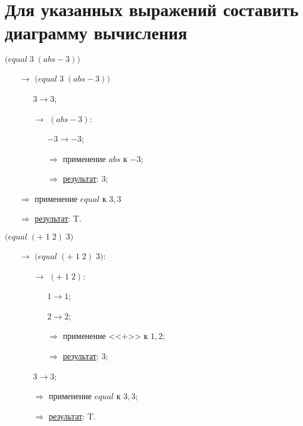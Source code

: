 
\section{Для указанных выражений составить диаграмму вычисления}

\vfill
\problem $\bigl(equal\; 3\; (abs -\!3)\bigr)$

\begin{itemize}
	\item[$\longrightarrow$]$\bigl(equal\; 3\; (abs -\!3)\bigr)$
	\begin{itemize}
		\item[\textbullet] $3 \to 3$;
		\item[$\longrightarrow$] $(abs -\!3)$:
		\begin{itemize}
			\item[\textbullet] $-3 \to -3$;
			\item[$\Longrightarrow$] применение $abs$ к $-3$;
			\item[$\Longrightarrow$] \underline{результат}: $3$;
		\end{itemize}
	\end{itemize}
	\item[$\Longrightarrow$] применение $equal$ к $3, 3$
	\item[$\Longrightarrow$] \underline{результат}: T.
\end{itemize}
\vfill


\problem $\bigl(equal\; (+\; 1\; 2)\; 3\bigr)$

\begin{itemize}
	\item[$\longrightarrow$] $\bigl(equal\; (+\; 1\; 2)\; 3\bigr)$:
	\begin{itemize}
		\item[$\longrightarrow$] $(+\; 1\; 2)$:
		\begin{itemize}
			\item[\textbullet] $1 \to 1$;
			\item[\textbullet] $2 \to 2$;
			\item[$\Longrightarrow$] применение <<$+$>> к $1, 2$;
			\item[$\Longrightarrow$] \underline{результат}: $3$;
		\end{itemize}
		\item[\textbullet] $3 \to 3$;
		\item[$\Longrightarrow$] применение $equal$ к $3, 3$;
		\item[$\Longrightarrow$] \underline{результат}: T.
	\end{itemize}
\end{itemize}
\vfill


